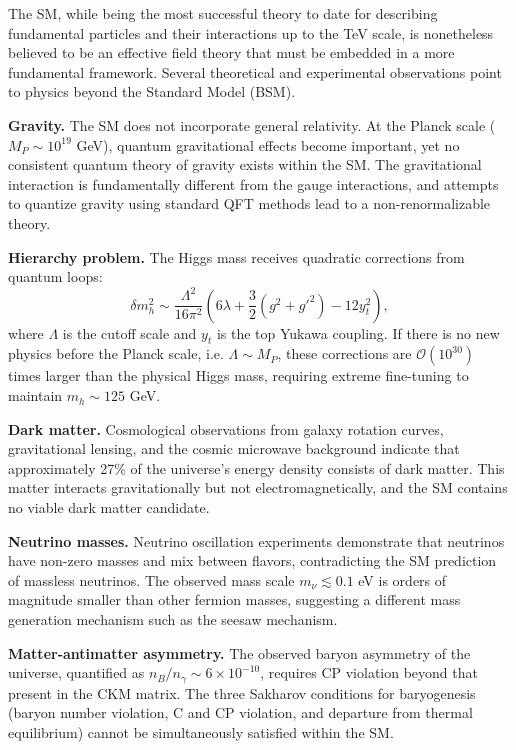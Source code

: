 The SM, while being the most successful theory to date for describing fundamental particles and their interactions up to the TeV scale, is nonetheless believed to be an effective field theory that must be embedded in a more fundamental framework. Several theoretical and experimental observations point to physics beyond the Standard Model (BSM).

\textbf{Gravity.} The SM does not incorporate general relativity. At the Planck scale ($M_P \sim 10^{19}$ GeV), quantum gravitational effects become important, yet no consistent quantum theory of gravity exists within the SM. The gravitational interaction is fundamentally different from the gauge interactions, and attempts to quantize gravity using standard QFT methods lead to a non-renormalizable theory.


\textbf{Hierarchy problem.} The Higgs mass receives quadratic corrections from quantum loops:
\begin{equation}
\delta m_h^2 \sim \frac{\Lambda^2}{16\pi^2} \left( 6\lambda + \frac{3}{2}(g^2 + g'^2) - 12y_t^2 \right),
\end{equation}
where $\Lambda$ is the cutoff scale and $y_t$ is the top Yukawa coupling. If there is no new physics before the Planck scale, i.e. $\Lambda \sim M_P$, these corrections are $\mathcal{O}(10^{30})$ times larger than the physical Higgs mass, requiring extreme fine-tuning to maintain $m_h \sim 125$ GeV.

\textbf{Dark matter.} Cosmological observations from galaxy rotation curves, gravitational lensing, and the cosmic microwave background indicate that approximately 27\% of the universe's energy density consists of dark matter. This matter interacts gravitationally but not electromagnetically, and the SM contains no viable dark matter candidate.

\textbf{Neutrino masses.} Neutrino oscillation experiments demonstrate that neutrinos have non-zero masses and mix between flavors, contradicting the SM prediction of massless neutrinos. The observed mass scale $m_\nu \lesssim 0.1$ eV is orders of magnitude smaller than other fermion masses, suggesting a different mass generation mechanism such as the seesaw mechanism.

\textbf{Matter-antimatter asymmetry.} The observed baryon asymmetry of the universe, quantified as $n_B/n_\gamma \sim 6 \times 10^{-10}$, requires CP violation beyond that present in the CKM matrix. The three Sakharov conditions for baryogenesis (baryon number violation, C and CP violation, and departure from thermal equilibrium) cannot be simultaneously satisfied within the SM.

